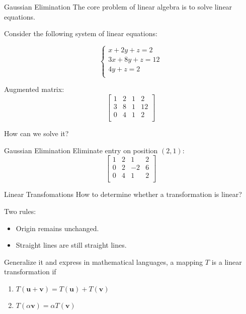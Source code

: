 \documentclass{beamer}
\begin{document}
\begin{frame}{Gaussian Elimination}
The core problem of linear algebra is to solve linear equations.

Consider the following system of linear equations:

\begin{equation*}
    \begin{cases}
        x+2y+z=2\\
        3x+8y+z=12\\
        4y+z=2\\
    \end{cases}
\end{equation*}

Augmented matrix:
\begin{equation*}
    \left[ \begin{matrix}
        1&		2&		1&		2\\
        3&		8&		1&		12\\
        0&		4&		1&		2\\
    \end{matrix} \right]
\end{equation*}

How can we solve it?
\end{frame}

\begin{frame}{Gaussian Elimination}
Eliminate entry on position $(2,1)$:
\begin{equation*}
    \left[ \begin{matrix}
        1&		2&		1&		2\\
        0&		2&		-2&		6\\
        0&		4&		1&		2\\
    \end{matrix} \right] 
\end{equation*}

\end{frame}







\begin{frame}{Linear Transfomations}
How to determine whether a transformation is linear?

\vspace{5pt}
Two rules:
\begin{itemize}
    \item Origin remains unchanged.
    \item Straight lines are still straight lines.
\end{itemize}

Generalize it and express in mathematical languages, a mapping $T$ is a linear transformation if
\begin{enumerate}
    \item $T\left( \mathbf{u}+\mathbf{v} \right) =T\left( \mathbf{u} \right) +T\left( \mathbf{v} \right)$
    \item $T\left( \alpha \mathbf{v} \right) =\alpha T\left( \mathbf{v} \right) $
\end{enumerate}
\end{frame}
\end{document}
